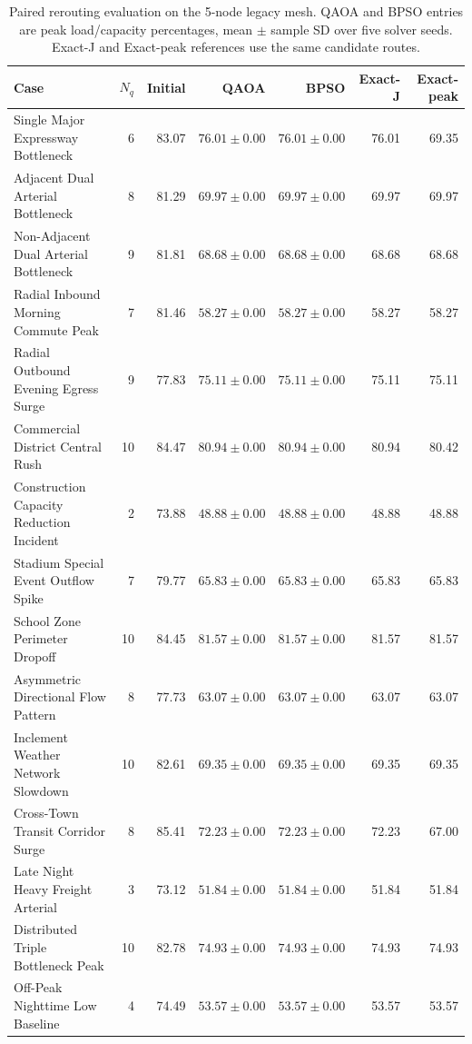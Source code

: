 \begin{table}[ht]
\centering\small
\caption{Paired rerouting evaluation on the 5-node legacy mesh. QAOA and BPSO entries are peak load/capacity percentages, mean $\pm$ sample SD over five solver seeds. Exact-J and Exact-peak references use the same candidate routes.}
\label{tab:yash_legacy_5}
\begin{tabular}{lrrrrrr}
\hline
Case & $N_q$ & Initial & QAOA & BPSO & Exact-J & Exact-peak \\ \hline
Single Major Expressway Bottleneck & 6 & 83.07 & $76.01\pm0.00$ & $76.01\pm0.00$ & 76.01 & 69.35 \\
Adjacent Dual Arterial Bottleneck & 8 & 81.29 & $69.97\pm0.00$ & $69.97\pm0.00$ & 69.97 & 69.97 \\
Non-Adjacent Dual Arterial Bottleneck & 9 & 81.81 & $68.68\pm0.00$ & $68.68\pm0.00$ & 68.68 & 68.68 \\
Radial Inbound Morning Commute Peak & 7 & 81.46 & $58.27\pm0.00$ & $58.27\pm0.00$ & 58.27 & 58.27 \\
Radial Outbound Evening Egress Surge & 9 & 77.83 & $75.11\pm0.00$ & $75.11\pm0.00$ & 75.11 & 75.11 \\
Commercial District Central Rush & 10 & 84.47 & $80.94\pm0.00$ & $80.94\pm0.00$ & 80.94 & 80.42 \\
Construction Capacity Reduction Incident & 2 & 73.88 & $48.88\pm0.00$ & $48.88\pm0.00$ & 48.88 & 48.88 \\
Stadium Special Event Outflow Spike & 7 & 79.77 & $65.83\pm0.00$ & $65.83\pm0.00$ & 65.83 & 65.83 \\
School Zone Perimeter Dropoff & 10 & 84.45 & $81.57\pm0.00$ & $81.57\pm0.00$ & 81.57 & 81.57 \\
Asymmetric Directional Flow Pattern & 8 & 77.73 & $63.07\pm0.00$ & $63.07\pm0.00$ & 63.07 & 63.07 \\
Inclement Weather Network Slowdown & 10 & 82.61 & $69.35\pm0.00$ & $69.35\pm0.00$ & 69.35 & 69.35 \\
Cross-Town Transit Corridor Surge & 8 & 85.41 & $72.23\pm0.00$ & $72.23\pm0.00$ & 72.23 & 67.00 \\
Late Night Heavy Freight Arterial & 3 & 73.12 & $51.84\pm0.00$ & $51.84\pm0.00$ & 51.84 & 51.84 \\
Distributed Triple Bottleneck Peak & 10 & 82.78 & $74.93\pm0.00$ & $74.93\pm0.00$ & 74.93 & 74.93 \\
Off-Peak Nighttime Low Baseline & 4 & 74.49 & $53.57\pm0.00$ & $53.57\pm0.00$ & 53.57 & 53.57 \\
\hline
\end{tabular}
\end{table}

